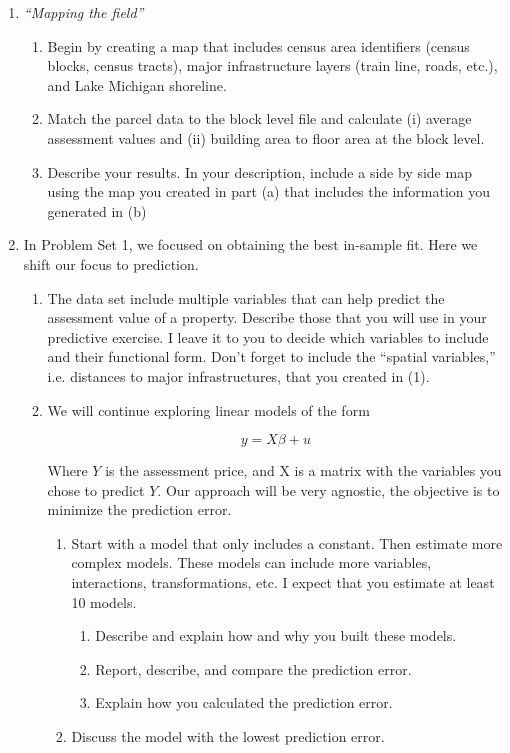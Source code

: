 \documentclass[12pt,onecolumn]{article}
\begin{document}
\begin{enumerate}
  \item {\it ``Mapping the field''}
  \begin{enumerate}
    \item Begin by creating a map that includes census area identifiers (census blocks, census tracts),  major infrastructure layers (train line, roads, etc.), and Lake Michigan shoreline.
    \item Match the parcel data to the block level file and calculate (i) average assessment values and (ii) building area to floor area at the  block level.
    \item Describe your results. In your description, include a side by side map using the map you created in part (a) that includes the information you generated in (b)
  \end{enumerate}
  
  
  \item In Problem Set 1, we focused on obtaining the best in-sample fit. Here we shift our focus to prediction.
  \begin{enumerate}
     \item The data set include multiple variables that can help predict the assessment value of a property.  Describe those that you will use in your predictive exercise. I leave it to you to decide which variables to include and their functional form. Don't forget to include  the ``spatial variables,'' i.e. distances to major infrastructures, that you created in (1).
  \item We will continue exploring linear models of the form
    
    \begin{equation}
      y = X\beta +u
    \end{equation}

  Where $Y$ is the assessment price, and X  is a matrix with the variables you chose to predict $Y$. Our approach will be very agnostic, the objective is to minimize the prediction error.
  \begin{enumerate}
    \item Start with a model that only includes a constant. Then estimate more complex models. These models can include more variables, interactions, transformations, etc. I expect that you estimate at least 10 models.
    \begin{enumerate}
      \item Describe and explain how and why you built these models.
      \item Report, describe, and compare the prediction error. 
      \item Explain how you calculated the prediction error.
    \end{enumerate}
    \item Discuss the model with the lowest prediction error.
  \end{enumerate}
  

\end{enumerate}
\end{enumerate}
\end{document}
